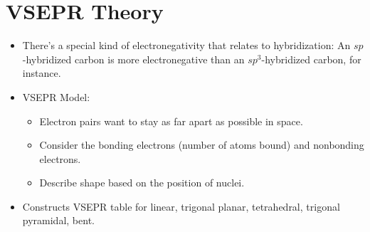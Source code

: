 \documentclass[../notes.tex]{subfiles}
\begin{document}
\section{VSEPR Theory}
\begin{itemize}
    \item {}There's a special kind of electronegativity that relates to hybridization: An $sp$-hybridized carbon is more electronegative than an $sp^3$-hybridized carbon, for instance.
    \item VSEPR Model:
    \begin{itemize}
        \item Electron pairs want to stay as far apart as possible in space.
        \item Consider the bonding electrons (number of atoms bound) and nonbonding electrons.
        \item Describe shape based on the position of nuclei.
    \end{itemize}
    \item Constructs VSEPR table for linear, trigonal planar, tetrahedral, trigonal pyramidal, bent.
\end{itemize}
\end{document}
